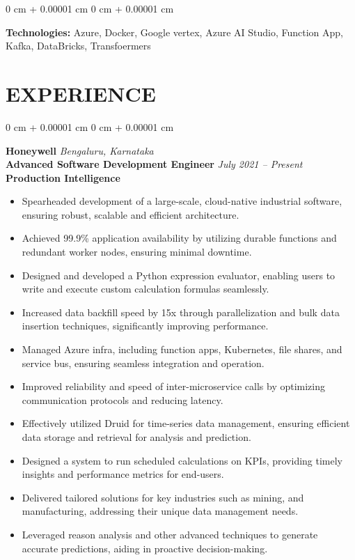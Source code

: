 \documentclass[10pt, letterpaper]{article}
\newenvironment{highlights}{
    \begin{itemize}[
        topsep=0.03 cm,
        parsep=0.02 cm,
        partopsep=0pt,
        itemsep=0pt,
        leftmargin=0 cm + 5pt
    ]
}{
    \end{itemize}
} %
\newenvironment{onecolentry}{
    \begin{adjustwidth}{
        0 cm + 0.00001 cm
    }{
        0 cm + 0.00001 cm
    }
}{
    \end{adjustwidth}
} %
\begin{document}
        \vspace{0.03 cm}

        \begin{onecolentry}
            \textbf{Technologies:} Azure, Docker, Google vertex, Azure AI Studio, Function App, Kafka, DataBricks, Transfoermers\end{onecolentry}

        

    \section{EXPERIENCE}

    
        \begin{onecolentry}
            \textbf{\large Honeywell} \hfill \textit{Bengaluru, Karnataka} \\  
            \textbf{\normalsize Advanced Software Development Engineer} \hfill \textit{July 2021 – Present} \\ %
            \textbf{Production Intelligence} \\  
            \begin{adjustwidth}{0.4cm}{0cm}
                \begin{highlights}
                    \item Spearheaded development of a large-scale, cloud-native industrial software, ensuring robust, scalable and efficient architecture.
                    \item Achieved 99.9\% application availability by utilizing durable functions and redundant worker nodes, ensuring minimal downtime.
                    \item Designed and developed a Python expression evaluator, enabling users to write and execute custom calculation formulas seamlessly.
                    \item Increased data backfill speed by 15x through parallelization and bulk data insertion techniques, significantly improving performance.
                    \item Managed Azure infra, including function apps, Kubernetes, file shares, and service bus, ensuring seamless integration and operation.
                    \item Improved reliability and speed of inter-microservice calls by optimizing communication protocols and reducing latency.
                    \item Effectively utilized Druid for time-series data management, ensuring efficient data storage and retrieval for analysis and prediction.
                    \item Designed a system to run scheduled calculations on KPIs, providing timely insights and performance metrics for end-users.
                    \item Delivered tailored solutions for key industries such as mining, and manufacturing, addressing their unique data management needs.
                    \item Leveraged reason analysis and other advanced techniques to generate accurate predictions, aiding in proactive decision-making.
                    

\end{highlights}
\end{adjustwidth}
\end{onecolentry}
\end{document}
